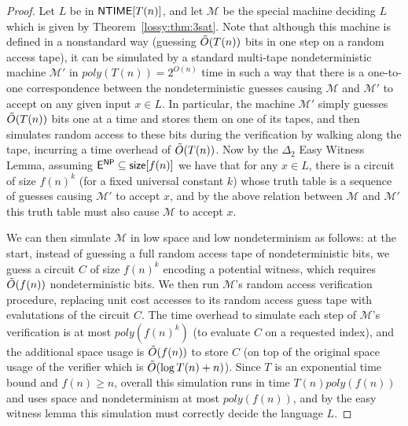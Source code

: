 \begin{proof}
Let $L$ be in $\cl{NTIME}[T(n)]$, and let $\mathcal{M}$ be the special machine deciding $L$ which is given by Theorem~\ref{lossy:thm:3sat}. Note that although this machine is defined in a nonstandard way (guessing $\Tilde{O}(T(n))$ bits in one step on a random access tape), it can be simulated by a standard multi-tape nondeterministic machine $\mathcal{M}'$ in $poly(T(n)) = 2^{O(n)}$ time in such a way that there is a one-to-one correspondence between the nondeterministic guesses causing $\mathcal{M}$ and $\mathcal{M}'$ to accept on any given input $x \in L$. In particular, the machine $\mathcal{M}'$ simply guesses $\Tilde{O}(T(n))$ bits one at a time and stores them on one of its tapes, and then simulates random access to these bits during the verification by walking along the tape, incurring a time overhead of $\Tilde{O}(T(n))$. Now by the $\Delta_2$ Easy Witness Lemma, assuming $\cl{E}^\cl{NP} \subseteq \cl{size}[f(n)]$ we have that for any $x \in L$, there is a circuit of size $f(n)^k$ (for a fixed universal constant $k$) whose truth table is a sequence of guesses causing $\mathcal{M}'$ to accept $x$, and by the above relation between $\mathcal{M}$ and $\mathcal{M}'$ this truth table must also cause $\mathcal{M}$ to accept $x$. 

We can then simulate $\mathcal{M}$ in low space and low nondeterminism as follows: at the start, instead of guessing a full random access tape of nondeterministic bits, we guess a circuit $C$ of size $f(n)^k$ encoding a potential witness, which requires $\Tilde{O}(f(n))$ nondeterministic bits. We then run $\mathcal{M}$'s random access verification procedure, replacing unit cost accesses to its random access guess tape with evalutations of the circuit $C$. The time overhead to simulate each step of $\mathcal{M}$'s verification is at most $poly(f(n)^k)$ (to evaluate $C$ on a requested index), and the additional space usage is $\Tilde{O}(f(n))$ to store $C$ (on top of the original space usage of the verifier which is $\Tilde{O}(\log T(n) + n)$). Since $T$ is an exponential time bound and $f(n) \geq n$, overall this simulation runs in time $T(n)poly(f(n))$ and uses space and nondeterminism at most $poly(f(n))$, and by the easy witness lemma this simulation must correctly decide the language $L$. 
\end{proof}

